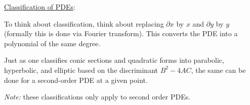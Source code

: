 \documentclass[12pt]{article}
\begin{document}
\vspace*{1em}
\underline{Classification of PDEs}:%

To think about classification, think about replacing $\partial x$ by $x$ and  $\partial y$ by $y$ (formally this is done via Fourier transform). This converts the PDE into a polynomial of the same degree.

Just as one classifies conic sections and quadratic forms into parabolic, hyperbolic, and elliptic based on the discriminant $B^2 - 4AC$, the same can be done for a second-order PDE at a given point. 

\textit{Note:} these classifications only apply to second order PDEs. 
\end{document}
